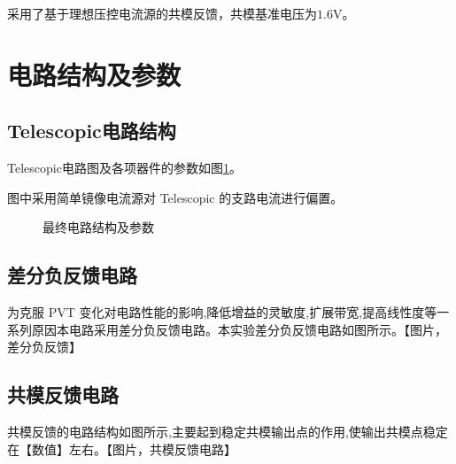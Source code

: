 \documentclass[a4paper]{article}
\newcommand{\uV}{\si{\volt}}
\begin{document}
采用了基于理想压控电流源的共模反馈，共模基准电压为$1.6\uV$。

\newpage

\section{电路结构及参数}

\subsection{Telescopic电路结构}
Telescopic电路图及各项器件的参数如图\ref{circuit}。

图中采用简单镜像电流源对 Telescopic 的支路电流进行偏置。
\begin{figure}[htb!]
  \centering
  
  \caption{最终电路结构及参数}
  \label{circuit}
\end{figure}
\subsection{差分负反馈电路}
为克服 PVT 变化对电路性能的影响,降低增益的灵敏度,扩展带宽,提高线性度等一系列原因本电路采用差分负反馈电路。本实验差分负反馈电路如图所示。【图片，差分负反馈】
\subsection{共模反馈电路}
共模反馈的电路结构如图所示,主要起到稳定共模输出点的作用,使输出共模点稳定在【数值】左右。【图片，共模反馈电路】

\newpage
\clearpage

\end{document}
